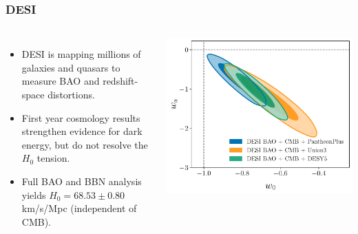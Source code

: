 \documentclass[aspectratio=169]{beamer}
\begin{document}
\begin{frame}
    \frametitle{DESI}
    \begin{columns}
        \begin{itemize}
            \item DESI is mapping millions of galaxies and quasars to measure BAO and redshift-space distortions.
            \item First year cosmology results strengthen evidence for dark energy, but do not resolve the $H_0$ tension. \hfill {}
            \item Full BAO and BBN analysis yields $H_0 = 68.53 \pm 0.80$ km/s/Mpc (independent of CMB). \hfill {}
        \end{itemize}
        \includegraphics[width=\textwidth]{figures/w0wa_DESI-Planck-SN-95lim.pdf}
    \end{columns}
\end{frame}
\end{document}
